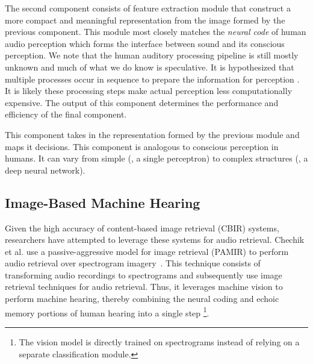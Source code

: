 The second component consists of feature extraction module that construct a more
compact and meaningful representation from the image formed by the previous
component.
This module most closely matches the \textit{neural code} of human audio
perception which forms the interface between sound and its conscious perception.
We note that the human auditory processing pipeline is still mostly unknown
and much of what we do know is speculative. 
It is hypothesized that multiple processes occur in
sequence to prepare the information for perception \cite{Eggermont2001}. 
It is likely these processing steps make actual perception less computationally
expensive. The output of this component determines the performance and
efficiency of the final component.

This component takes in the representation formed by the previous module 
and maps it decisions. This component is analogous to conscious perception in
humans. It can vary from simple (\eg, a single perceptron) to complex
structures (\eg, a deep neural network).

\subsection{Image-Based Machine Hearing}

Given the high accuracy of content-based image retrieval (CBIR) systems, 
researchers have attempted to leverage these systems for audio retrieval.
Chechik et al. use a passive-aggressive model for image retrieval
(PAMIR) to perform audio retrieval over spectrogram imagery~\cite{Chechik2008}.
This technique consists of transforming audio recordings to spectrograms and
subsequently use image retrieval techniques for audio retrieval.
Thus, it leverages machine vision to perform machine hearing, thereby 
combining the neural coding and echoic memory portions of human hearing 
into a single step \footnote{The vision model is directly trained on
spectrograms instead of relying on a separate classification module.}.


